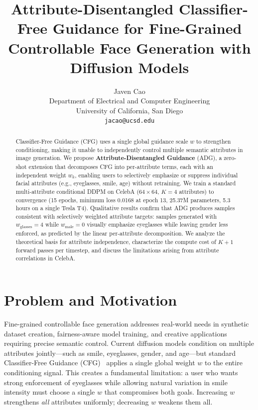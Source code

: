 \documentclass{article}
\title{Attribute-Disentangled Classifier-Free Guidance for Fine-Grained Controllable Face Generation with Diffusion Models}
\author{%
  Javen Cao \\
  Department of Electrical and Computer Engineering \\
  University of California, San Diego \\
  \texttt{jacao@ucsd.edu}
}
\begin{document}
\maketitle

\vspace{-1.0em}

\begin{abstract}
Classifier-Free Guidance (CFG) uses a single global guidance scale $w$ to strengthen conditioning, making it unable to independently control multiple semantic attributes in image generation. We propose \textbf{Attribute-Disentangled Guidance} (ADG), a zero-shot extension that decomposes CFG into per-attribute terms, each with an independent weight $w_k$, enabling users to selectively emphasize or suppress individual facial attributes (e.g., eyeglasses, smile, age) without retraining. We train a standard multi-attribute conditional DDPM on CelebA ($64{\times}64$, $K{=}4$ attributes) to convergence (15 epochs, minimum loss 0.0168 at epoch 13, 25.37M parameters, 5.3 hours on a single Tesla T4). Qualitative results confirm that ADG produces samples consistent with selectively weighted attribute targets: samples generated with $w_{\text{glasses}}{=}4$ while $w_{\text{male}}{=}0$ visually emphasize eyeglasses while leaving gender less enforced, as predicted by the linear per-attribute decomposition. We analyze the theoretical basis for attribute independence, characterize the compute cost of $K{+}1$ forward passes per timestep, and discuss the limitations arising from attribute correlations in CelebA.
\end{abstract}

\section{Problem and Motivation}
\label{sec:intro}

Fine-grained controllable face generation addresses real-world needs in synthetic dataset creation, fairness-aware model training, and creative applications requiring precise semantic control. Current diffusion models condition on multiple attributes jointly—such as smile, eyeglasses, gender, and age—but standard Classifier-Free Guidance (CFG)~\citep{ho2022cfg} applies a single global weight $w$ to the entire conditioning signal. This creates a fundamental limitation: a user who wants strong enforcement of eyeglasses while allowing natural variation in smile intensity must choose a single $w$ that compromises both goals. Increasing $w$ strengthens \emph{all} attributes uniformly; decreasing $w$ weakens them all.
\end{document}
